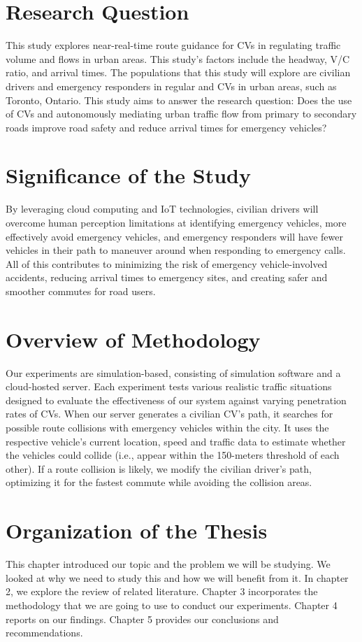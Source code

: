 \section{Research Question}
This study explores near-real-time route guidance for CVs in regulating traffic volume and flows in urban areas. This study's factors include the headway, V/C ratio, and arrival times. The populations that this study will explore are civilian drivers and emergency responders in regular and CVs in urban areas, such as Toronto, Ontario. 
This study aims to answer the research question: Does the use of CVs and autonomously mediating urban traffic flow from primary to secondary roads improve road safety and reduce arrival times for emergency vehicles?


\section{Significance of the Study}
By leveraging cloud computing and IoT technologies, civilian drivers will overcome human perception limitations at identifying emergency vehicles, more effectively avoid emergency vehicles, and emergency responders will have fewer vehicles in their path to maneuver around when responding to emergency calls. All of this contributes to minimizing the risk of emergency vehicle-involved accidents, reducing arrival times to emergency sites, and creating safer and smoother commutes for road users.


\section{Overview of Methodology}
Our experiments are simulation-based, consisting of simulation software and a cloud-hosted server. Each experiment tests various realistic traffic situations designed to evaluate the effectiveness of our system against varying penetration rates of CVs. When our server generates a civilian CV's path, it searches for possible route collisions with emergency vehicles within the city. It uses the respective vehicle's current location, speed and traffic data to estimate whether the vehicles could collide (i.e., appear within the 150-meters \cite{MoveOver_2021, MTO_2020} threshold of each other). If a route collision is likely, we modify the civilian driver's path, optimizing it for the fastest commute while avoiding the collision areas.


\section{Organization of the Thesis}
This chapter introduced our topic and the problem we will be studying. We looked at why we need to study this and how we will benefit from it. In chapter 2, we explore the review of related literature. Chapter 3 incorporates the methodology that we are going to use to conduct our experiments. Chapter 4 reports on our findings. Chapter 5 provides our conclusions and recommendations.
